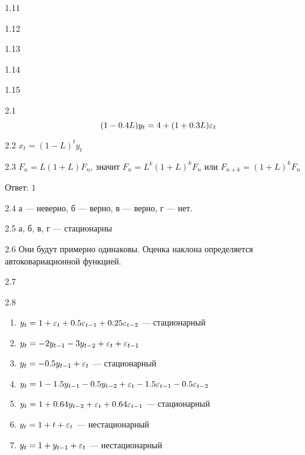 \protect \hypertarget {soln:1.11}{}
\begin{solution}{{1.11}}
\end{solution}
\protect \hypertarget {soln:1.12}{}
\begin{solution}{{1.12}}
\end{solution}
\protect \hypertarget {soln:1.13}{}
\begin{solution}{{1.13}}
\end{solution}
\protect \hypertarget {soln:1.14}{}
\begin{solution}{{1.14}}
\end{solution}
\protect \hypertarget {soln:1.15}{}
\begin{solution}{{1.15}}
\end{solution}
\protect \hypertarget {soln:2.1}{}
\begin{solution}{{2.1}}
\[
(1 - 0.4L)y_t = 4 + (1 + 0.3L)\varepsilon_t
\]
\end{solution}
\protect \hypertarget {soln:2.2}{}
\begin{solution}{{2.2}}
$x_{t}=(1-L)^{t}y_{t}$
\end{solution}
\protect \hypertarget {soln:2.3}{}
\begin{solution}{{2.3}}
$ F_{n}=L(1+L)F_{n} $, значит $ F_{n}=L^{k}(1+L)^{k}F_{n} $ или $ F_{n+k}=(1+L)^{k}F_{n} $

Ответ: $1$
\end{solution}
\protect \hypertarget {soln:2.4}{}
\begin{solution}{{2.4}}
а — неверно, б — верно, в — верно, г — нет.
\end{solution}
\protect \hypertarget {soln:2.5}{}
\begin{solution}{{2.5}}
а, б, в, г — стационарны
\end{solution}
\protect \hypertarget {soln:2.6}{}
\begin{solution}{{2.6}}
Они будут примерно одинаковы. Оценка наклона определяется автоковариационной функцией.
\end{solution}
\protect \hypertarget {soln:2.7}{}
\begin{solution}{{2.7}}

\end{solution}
\protect \hypertarget {soln:2.8}{}
\begin{solution}{{2.8}}

\begin{enumerate}
\item $y_t=1+\varepsilon_t+0.5\varepsilon_{t-1}+0.25\varepsilon_{t-2}$ — стационарный
\item $y_t=-2y_{t-1}-3y_{t-2}+\varepsilon_t+\varepsilon_{t-1}$
\item $y_t=-0.5y_{t-1} + \varepsilon_t$ — стационарный
\item $y_t=1-1.5 y_{t-1} - 0.5 y_{t-2} + \varepsilon_t - 1.5\varepsilon_{t-1} - 0.5\varepsilon_{t-2}$
\item $y_t=1+0.64y_{t-2}+\varepsilon_t+0.64\varepsilon_{t-1}$ — стационарный
\item $y_t=1+t+\varepsilon_t$ — нестационарный
\item $y_t=1+y_{t-1}+\varepsilon_t$ — нестационарный
\end{enumerate}
\end{solution}
